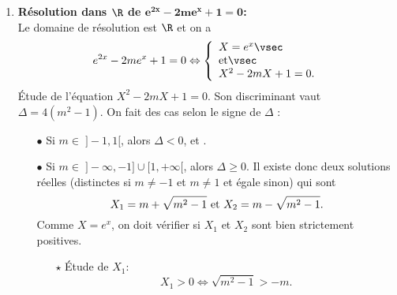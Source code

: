 \begin{correction}
\begin{enumerate}
\item \textbf{R\'esolution dans $\mathbf{\R}$ de $\mathbf{e^{2x}-2me^x+1=0}$:}\\
\noindent Le domaine de r\'esolution est $\R$ et on a 
$$e^{2x}-2me^x+1=0 \Leftrightarrow  \left\lbrace  \begin{array}{lll}
X=e^x\vsec\\
\hbox{et}\vsec\\
X^2-2mX+1=0.
\end{array}\right.$$
\'Etude de l'\'equation $X^2-2mX+1=0$. Son discriminant vaut $\Delta=4(m^2-1)$. On fait des cas selon le signe de $\Delta$ :
\begin{itemize}
\item[$\bullet$] Si  $m\in \; \rbrack -1,1\lbrack$, alors $\Delta <0$, et .
\item[$\bullet$] Si $m\in \; \rbrack -\infty, -1\rbrack\cup\lbrack 1,+\infty\lbrack$, alors $\Delta \geq 0$. Il existe donc deux solutions r\'eelles (distinctes si $m\not= -1$ et $m\not= 1$ et \'egale sinon) qui sont
$$X_1=m+\sqrt{m^2-1}\ \hbox{et}\ X_2=m-\sqrt{m^2-1}.$$
Comme $X=e^x$, on doit v\'erifier si $X_1$ et $X_2$ sont bien strictement positives.
\begin{itemize} 
\item[$\star$] \'Etude de $X_1$: 
$$X_1> 0\Leftrightarrow \sqrt{m^2-1}> -m.$$

\end{itemize}
\end{itemize}
\end{enumerate}
\end{correction}
